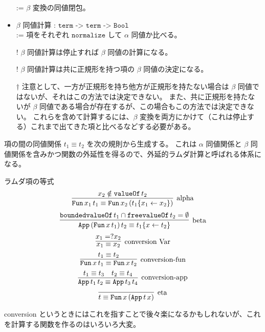 \documentclass[dvipdfmx]{jsarticle}
\begin{document}
\begin{itemize}
    := \(\beta\) 変換の同値閉包。
  \item \(\beta\) 同値計算 : \(\texttt{term -> term -> Bool}\) \\
    := 項をそれぞれ \(\texttt{normalize}\) して \(\alpha\) 同値か比べる。
  \item[!] \(\beta\) 同値計算は停止すれば \(\beta\) 同値の計算になる。
  \item[!] \(\beta\) 同値計算は共に正規形を持つ項の \(\beta\) 同値の決定になる。 
  \item[\(\dagger\)] 注意として、一方が正規形を持ち他方が正規形を持たない場合は \(\beta\) 同値ではないが、それはこの方法では決定できない。
    また、共に正規形を持たないが \(\beta\) 同値である場合が存在するが、この場合もこの方法では決定できない。
    これらを含めて計算するには、\(\beta\) 変換を両方にかけて（これは停止する）これまで出てきた項と比べるなどする必要がある。
\end{itemize}

項の間の同値関係 \(t_1 \equiv t_2\) を次の規則から生成する。
これは \(\alpha\) 同値関係と \(\beta\) 同値関係を含みかつ関数の外延性を得るので、外延的ラムダ計算と呼ばれる体系になる。

\begin{itembox}[l]{ラムダ項の等式}
  \[\infer[\text{alpha}]{\texttt{Fun} \, x_1 \, t_1 \equiv \texttt{Fun} \, x_2 \, (t_1\{x_1 \leftarrow x_2\})}{x_2 \notin \texttt{valueOf} \, t_2}\]
  \[\infer[\text{beta}]{\texttt{App} \, (\texttt{Fun} \, x \, t_1) \, t_2 \equiv t_1\{x \leftarrow t_2\}}{\texttt{boundedvalueOf} \, t_1 \cap \texttt{freevalueOf} \, t_2 = \emptyset}\]
  \[\infer[\text{conversion Var}]{x_1 \equiv x_2}{x_1 =? x_2}\]
  \[\infer[\text{conversion-fun}]{\texttt{Fun} \, x \, t_1 \equiv \texttt{Fun} \, x \, t_2}{t_1 \equiv t_2}\]
  \[\infer[\text{conversion-app}]{\texttt{App} \, t_1 \, t_2 \equiv \texttt{App} \, t_3 \, t_4}{t_1 \equiv t_3 & t_2 \equiv t_4}\]
  \[\infer[\text{eta}]{t \equiv \texttt{Fun} \, x \, (\texttt{App} \, t \, x)}{}\]
\end{itembox}

conversion というときにはこれを指すことで後々楽になるかもしれないが、これを計算する関数を作るのはいろいろ大変。
\end{document}
